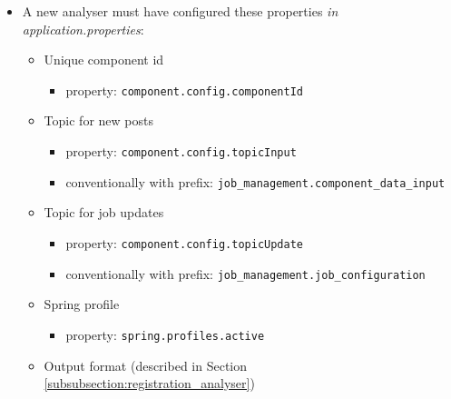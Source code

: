 \begin{itemize}
  
  \item A new analyser must have configured these properties \textit{in application.proper\-ties}:
  
  \begin{itemize}
  \item Unique component id
	\begin{itemize}
        \item property: \texttt{component.config.componentId}
    \end{itemize}
  
  \item Topic for new posts
    \begin{itemize}
	    \item property: \texttt{component.config.topicInput}
        \item conventionally with prefix: \texttt{job\_management.component\_data\_in\-put}
    \end{itemize}
  
  \item Topic for job updates
    \begin{itemize}
	    \item property: \texttt{component.config.topicUpdate}
        \item conventionally with prefix: \texttt{job\_management.job\_configuration}
   \end{itemize}
  
  \item Spring profile
    \begin{itemize}
	    \item property: \texttt{spring.profiles.active}
   \end{itemize}
  \item Output format (described in Section \ref{subsubsection:registration_analyser})
  
  \end{itemize}
  

\end{itemize}
